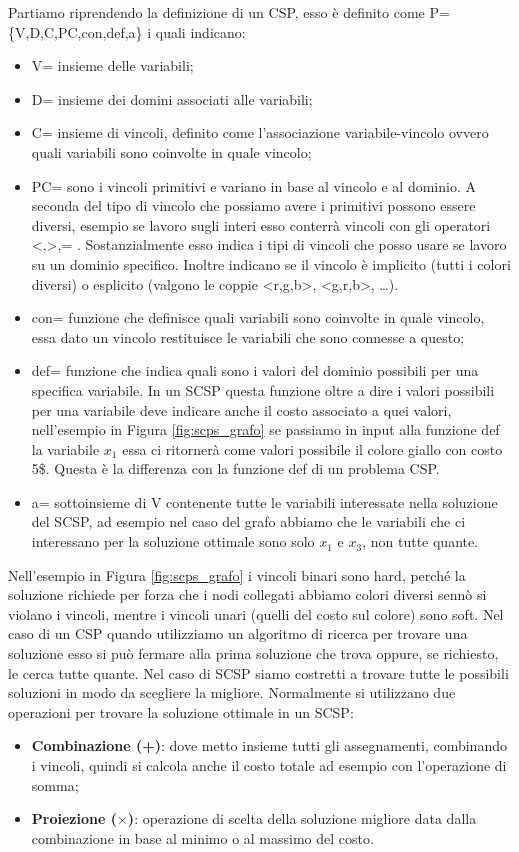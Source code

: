 Partiamo riprendendo la definizione di un CSP, esso è definito come P=\{V,D,C,PC,con,def,a\} i quali indicano:
\begin{itemize}
    \item V= insieme delle variabili;
    \item D= insieme dei domini associati alle variabili;
    \item C= insieme di vincoli, definito come l'associazione variabile-vincolo ovvero quali variabili sono coinvolte in quale vincolo;
    \item PC= sono i vincoli primitivi e variano in base al vincolo e al dominio. A seconda del tipo di vincolo che possiamo avere i primitivi possono essere diversi, esempio se lavoro sugli interi esso conterrà vincoli con gli operatori <,>,= . Sostanzialmente esso indica i tipi di vincoli che posso usare se lavoro su un dominio specifico. Inoltre indicano se il vincolo è implicito (tutti i colori diversi) o esplicito (valgono le coppie <r,g,b>, <g,r,b>, …).
    \item con= funzione che definisce quali variabili sono coinvolte in quale vincolo, essa dato un vincolo restituisce le variabili che sono connesse a questo;
    \item def= funzione che indica quali sono i valori del dominio possibili per una specifica variabile. In un SCSP questa funzione oltre a dire i valori possibili per una variabile deve indicare anche il costo associato a quei valori, nell'esempio in Figura \ref{fig:scps_grafo} se passiamo in input alla funzione def la variabile $x_1$ essa ci ritornerà come valori possibile il colore giallo con costo 5\$. Questa è la differenza con la funzione def di un problema CSP.
    \item a= sottoinsieme di V contenente tutte le variabili interessate nella soluzione del SCSP, ad esempio nel caso del grafo abbiamo che le variabili che ci interessano per la soluzione ottimale sono solo $x_1$ e $x_3$, non tutte quante.
\end{itemize}
Nell'esempio in Figura \ref{fig:scps_grafo} i vincoli binari sono hard, perché la soluzione richiede per forza che i nodi collegati abbiamo colori diversi sennò si violano i vincoli, mentre i vincoli unari (quelli del costo sul colore) sono soft.
Nel caso di un CSP quando utilizziamo un algoritmo di ricerca per trovare una soluzione esso si può fermare alla prima soluzione che trova oppure, se richiesto, le cerca tutte quante. Nel caso di SCSP siamo costretti a trovare tutte le possibili soluzioni in modo da scegliere la migliore.
Normalmente si utilizzano due operazioni per trovare la soluzione ottimale in un SCSP:
\begin{itemize}
    \item \textbf{Combinazione (+)}: dove metto insieme tutti gli assegnamenti, combinando i vincoli, quindi si calcola anche il costo totale ad esempio con l'operazione di somma;
    \item \textbf{Proiezione ($\times$)}: operazione di scelta della soluzione migliore data dalla combinazione in base al minimo o al massimo del costo.
\end{itemize}
